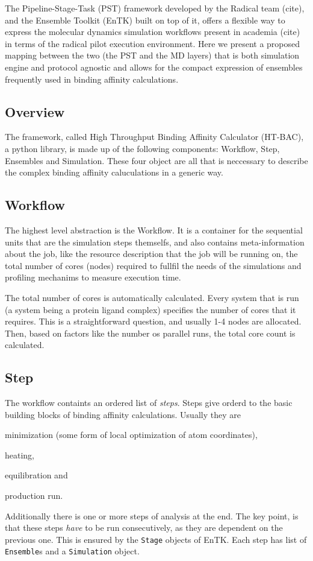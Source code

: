 The Pipeline-Stage-Task (PST) framework developed by the Radical team (cite), and the Ensemble Toolkit (EnTK) built on top of it, offers a flexible way to express the molecular dynamics simulation workflows present in academia (cite) in terms of the radical pilot execution environment. Here we present a proposed mapping between the two (the PST and the MD layers) that is both simulation engine and protocol agnostic and allows for the compact expression of ensembles frequently used in binding affinity calculations.

\subsection{Overview}

The framework, called High Throughput Binding Affinity Calculator (HT-BAC), a python library, is made up of the following components: Workflow, Step, Ensembles and Simulation. These four object are all that is neccessary to describe the complex binding affinity caluculations in a generic way.

\subsection{Workflow}

The highest level abstraction is the Workflow. It is a container for the sequential units that are the simulation steps themselfs, and also contains meta-information about the job, like the resource description that the job will be running on, the total number of cores (nodes) required to fullfil the needs of the simulations and profiling mechanims to measure execution time.

The total number of cores is automatically calculated. Every system that is run (a system being a protein ligand complex) specifies the number of cores that it requires. This is a straightforward question, and usually 1-4 nodes are allocated. Then, based on factors like the number os parallel runs, the total core count is calculated.

\subsection{Step}

The workflow containts an ordered list of \emph{steps}. Steps give orderd to the basic building blocks of binding affinity calculations. Usually they are
\begin{enumerate*}[label=(\roman*)]
  \item minimization (some form of local optimization of atom coordinates),
  \item heating,
  \item equilibration and
  \item production run.
\end{enumerate*}
Additionally there is one or more steps of analysis at the end. The key point, is that these steps \emph{have} to be run consecutively, as they are dependent on the previous one. This is ensured by the \texttt{Stage} objects of EnTK. Each step has list of \texttt{Ensemble}s and a \texttt{Simulation} object.

